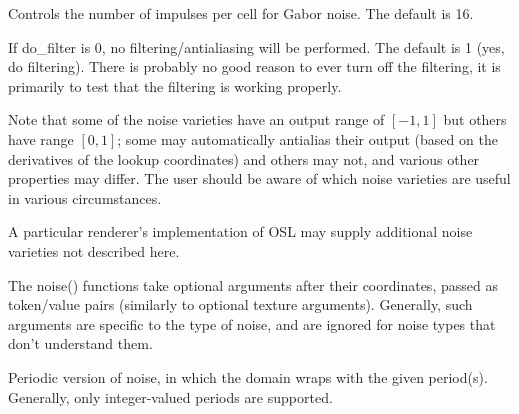 \documentclass[11pt,letterpaper]{book}
\begin{document}
\vspace{12pt}
Controls the number of impulses per cell for Gabor noise.
The default is 16.
\apiend
\vspace{-16pt}

\vspace{12pt}
If {\cf do_filter} is 0, no filtering/antialiasing will
be performed.  The default is 1 (yes, do filtering).  There is probably
no good reason to ever turn off the filtering, it is primarily to test
that the filtering is working properly.
\apiend
\vspace{-16pt}

\apiend


Note that some of the noise varieties have an output range of $[-1,1]$
but others have range $[0,1]$; some may automatically antialias their
output (based on the derivatives of the lookup coordinates) and others
may not, and various other properties may differ.  The user should be
aware of which noise varieties are useful in various circumstances.

A particular renderer's implementation of OSL may supply additional
noise varieties not described here.

The {\cf noise()} functions take optional arguments after their
coordinates, passed as token/value pairs (similarly to optional texture
arguments).  Generally, such arguments are specific to the type of
noise, and are ignored for noise types that don't understand them.

\apiend




Periodic version of {\cf noise}, in which the domain wraps with the given
period(s).  Generally, only integer-valued periods are supported.
\apiend




\end{document}
